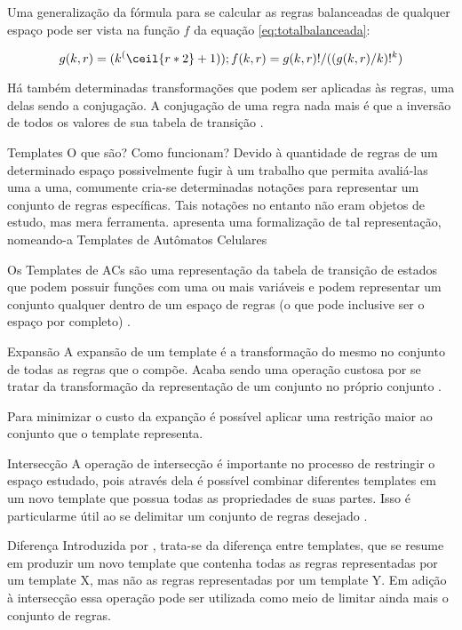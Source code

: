Uma generalização da fórmula para se calcular as regras balanceadas de qualquer espaço pode ser vista na função $f$ da equação \eqref{eq:totalbalanceada}:

\begin{equation}\label{eq:totalbalanceada}
g(k, r) = (k^(\ceil{r * 2} + 1));
f(k, r) = g(k, r)! / ((g(k, r) / k)! ^ k)
\end{equation}



Há também determinadas transformações que podem ser aplicadas às regras, uma delas sendo a conjugação. A conjugação de uma regra nada mais é que a inversão de todos os valores de sua tabela de transição \cite{verardo2014}. 



Templates
	O que são?
	Como funcionam?
Devido à quantidade de regras de um determinado espaço possivelmente fugir à um trabalho que permita avaliá-las uma a uma, comumente cria-se determinadas notações para representar um conjunto de regras específicas. Tais notações no entanto não eram objetos de estudo, mas mera ferramenta.  apresenta uma formalização de tal representação, nomeando-a Templates de Autômatos Celulares

Os Templates de ACs são uma representação da tabela de transição de estados que podem possuir funções com uma ou mais variáveis e podem representar um conjunto qualquer dentro de um espaço de regras (o que pode inclusive ser o espaço por completo) \cite{verardoenglish2014}.


	Expansão
A expansão de um template é a transformação do mesmo no conjunto de todas as regras que o compõe. Acaba sendo uma operação custosa por se tratar da transformação da representação de um conjunto no próprio conjunto \cite{verardo2014}.

Para minimizar o custo da expanção é possível aplicar uma restrição maior ao conjunto que o template representa. 

	Intersecção
A operação de intersecção é importante no processo de restringir o espaço estudado, pois através dela é possível combinar diferentes templates em um novo template que possua todas as propriedades de suas partes. Isso é particularme útil ao se delimitar um conjunto de regras desejado \cite{verardo2014}.	
	
	Diferença
Introduzida por , trata-se da diferença entre templates, que se resume em produzir um novo template que contenha todas as regras representadas por um template X, mas não as regras representadas por um template Y. Em adição à intersecção essa operação pode ser utilizada como meio de limitar ainda mais o conjunto de regras.

